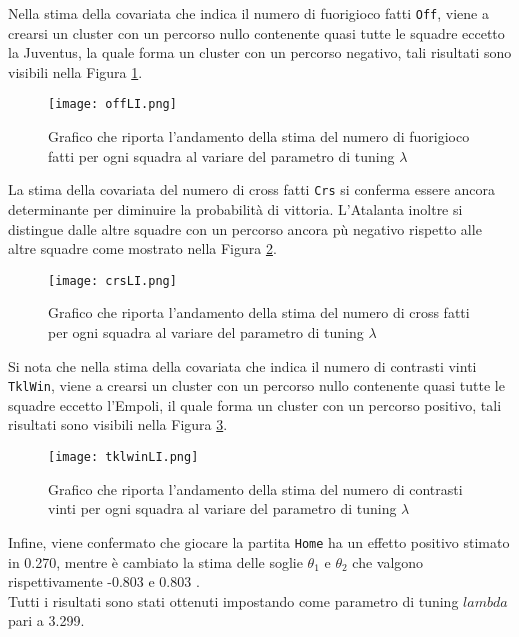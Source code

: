 Nella stima della covariata che indica il numero di fuorigioco fatti \texttt{Off}, viene a crearsi un cluster con un percorso nullo contenente quasi tutte le squadre eccetto la Juventus, la quale forma un cluster con un percorso negativo, tali risultati sono visibili nella Figura \ref{fig:offLI}.\\
\begin{figure}[htbp]
	\begin{center}
		\texttt{[image: offLI.png]}
		\caption{Grafico che riporta l'andamento della stima del numero di fuorigioco fatti per ogni squadra al variare del parametro di tuning $\lambda$} \label{fig:offLI}
	\end{center}
\end{figure}
La stima della covariata del numero di cross fatti \texttt{Crs} si conferma essere ancora determinante per diminuire la probabilità di vittoria. L'Atalanta inoltre si distingue dalle altre squadre con un percorso ancora pù negativo rispetto alle altre squadre come mostrato nella Figura \ref{fig:crsLI}.\\
\begin{figure}[htbp]
	\begin{center}
		\texttt{[image: crsLI.png]}
		\caption{Grafico che riporta l'andamento della stima del numero di cross fatti per ogni squadra al variare del parametro di tuning $\lambda$} \label{fig:crsLI}
	\end{center}
\end{figure}
Si nota che nella stima della covariata che indica il numero di contrasti vinti \texttt{TklWin}, viene a crearsi un cluster con un percorso nullo contenente quasi tutte le squadre eccetto l'Empoli, il quale forma un cluster con un percorso positivo, tali risultati sono visibili nella Figura \ref{fig:tklwinLI}.\\
\begin{figure}[htbp]
	\begin{center}
		\texttt{[image: tklwinLI.png]}
		\caption{Grafico che riporta l'andamento della stima del numero di contrasti vinti per ogni squadra al variare del parametro di tuning $\lambda$} \label{fig:tklwinLI}
	\end{center}
\end{figure}
Infine, viene confermato che giocare la partita \texttt{Home} ha un effetto positivo stimato in 0.270, mentre è cambiato la stima delle soglie $\theta_1$ e $\theta_2$ che valgono rispettivamente -0.803  e 0.803 .\\
Tutti i risultati sono stati ottenuti impostando come parametro di tuning $lambda$ pari a 3.299.\\

